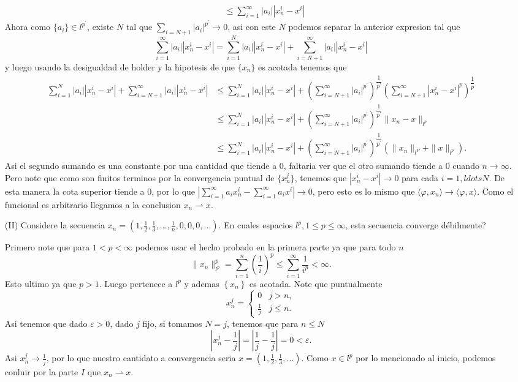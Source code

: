 \begin{itemize}
\begin{sproof}
\begin{align*}
       &\leq \sum_{i=1}^\infty |a_i||x_n^i-x^i|
     \end{align*}
     Ahora como $\{a_i\}\in l^{p^\prime}$, existe $N$ tal que $\sum_{i=N+1}|a_i|^{p^\prime}\to 0$, asi con este $N$ podemos separar la anterior expresion tal que
     $$\sum_{i=1}^\infty |a_i||x_n^i-x^i|=\sum_{i=1}^N |a_i||x_n^i-x^i|+\sum_{i=N+1}^\infty |a_i||x_n^i-x^i|$$
     y luego usando la desigualdad de holder y la hipotesis de que $\{x_n\}$ es acotada tenemos que
     \begin{align*}
       \sum_{i=1}^N |a_i||x_n^i-x^i|+\sum_{i=N+1}^\infty |a_i||x_n^i-x^i|&\leq\sum_{i=1}^N |a_i||x_n^i-x^i|+\left(\sum_{i=N+1}^\infty |a_i|^{p^\prime}\right)^{\dfrac{1}{p^\prime}}\left( \sum_{i=N+1}^\infty|x_n^i-x^i|^p \right)^{\dfrac{1}{p}}\\
       &\leq\sum_{i=1}^N |a_i||x_n^i-x^i|+\left(\sum_{i=N+1}^\infty |a_i|^{p^\prime}\right)^{\dfrac{1}{p^\prime}}\|x_n-x\|_{l^p}\\
       &\leq\sum_{i=1}^N |a_i||x_n^i-x^i|+\left(\sum_{i=N+1}^\infty |a_i|^{p^\prime}\right)^{\dfrac{1}{p^\prime}}(\|x_n\|_{l^P}+\|x\|_{l^p}).
     \end{align*}
     Asi el segundo sumando es una constante por una cantidad que tiende a 0, faltaria ver que el otro sumando tiende a 0 cuando $n\to\infty.$ Pero note que como son finitos terminos por la convergencia puntual de $\{x_n^j\}$, tenemos que $|x_n^i-x^i|\to 0$ para cada $i=1,ldots N.$ De esta manera la cota superior tiende a 0, por lo que $\left|\sum_{i=1}^\infty a_ix_n^i-\sum_{i=1}^\infty a_ix^i\right|\to 0$, pero esto es lo mismo que $\langle\varphi,x_n\rangle\to\langle\varphi,x\rangle.$ Como el funcional es arbitrario llegamos a la conclusion $x_n \rightharpoonup x$.


  \end{sproof}
  \item[(II)]  Considere la secuencia $x_n=\left(1, \frac{1}{2}, \frac{1}{3}, \ldots, \frac{1}{n}, 0,0,0, \ldots\right)$. En cuales espacios $l^p, 1 \leq p \leq \infty$, esta secuencia converge débilmente?
  \begin{sproof}
    Primero note que para $1<p<\infty$ podemos usar el hecho probado en la primera parte ya que para todo $n$
    $$\|x_n\|_{l^p}^p=\sum_{i=1}^n\left(\frac{1}{i}\right)^p\leq\sum_{i=1}^\infty\frac{1}{i^p}<\infty.$$
    Esto ultimo ya que $p>1.$ Luego pertenece a $l^p$ y ademas $\left\{x_n\right\}$ es acotada. Note que puntualmente 
    $$x_n^j=\begin{cases}
      0 &j>n,\\
      \frac{1}{j} &j\leq n.
    \end{cases}$$
    Asi tenemos que dado $\varepsilon>0$, dado $j$ fijo, si tomamos $N=j$, tenemos que para $n\leq N$
    $$\left|x_n^j-\frac{1}{j}\right|=\left|\frac{1}{j}-\frac{1}{j}\right|=0<\varepsilon.$$
    Asi $x_n^j\to\frac{1}{j}$, por lo que nuestro cantidato a convergencia seria $x=(1,\frac{1}{2},\frac{1}{3},\ldots).$ Como $x\in l^p$ por lo mencionado al inicio, podemos conluir por la parte $I$ que $x_n \rightharpoonup x.$ \\


\end{sproof}
\end{itemize}
